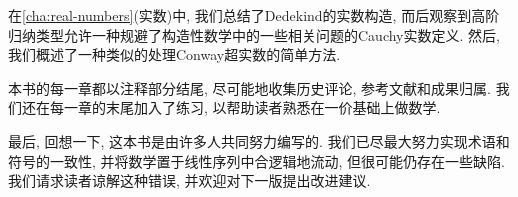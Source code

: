 在\cref{cha:real-numbers}(实数)中, 我们总结了Dedekind的实数构造, 而后观察到高阶归纳类型允许一种规避了构造性数学中的一些相关问题的Cauchy实数定义. 
然后, 我们概述了一种类似的处理Conway超实数的简单方法. 

本书的每一章都以注释部分结尾, 尽可能地收集历史评论, 参考文献和成果归属. 
我们还在每一章的末尾加入了练习, 以帮助读者熟悉在一价基础上做数学. 

最后, 回想一下, 这本书是由许多人共同努力编写的. 
我们已尽最大努力实现术语和符号的一致性, 并将数学置于线性序列中合逻辑地流动, 但很可能仍存在一些缺陷. 
我们请求读者谅解这种错误, 并欢迎对下一版提出改进建议. 


